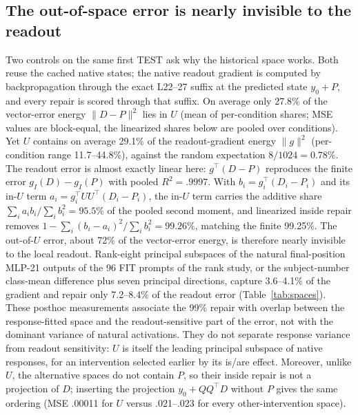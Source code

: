 \documentclass[11pt]{article}
\begin{document}
\subsection{The out-of-space error is nearly invisible to the readout}
Two controls on the same first TEST ask why the historical space works. Both reuse the cached native states; the native readout gradient is computed by backpropagation through the exact L22--27 suffix at the predicted state $y_0+P$, and every repair is scored through that suffix. On average only 27.8\% of the vector-error energy $\|D-P\|^2$ lies in $U$ (mean of per-condition shares; MSE values are block-equal, the linearized shares below are pooled over conditions). Yet $U$ contains on average 29.1\% of the readout-gradient energy $\|g\|^2$ (per-condition range 11.7--44.8\%), against the random expectation $8/1024=0.78\%$. The readout error is almost exactly linear here: $g^\top(D-P)$ reproduces the finite error $g_I(D)-g_I(P)$ with pooled $R^2=.9997$. With $b_i=g_i^\top(D_i-P_i)$ and its in-$U$ term $a_i=g_i^\top UU^\top(D_i-P_i)$, the in-$U$ term carries the additive share $\sum_i a_ib_i/\sum_i b_i^2=95.5\%$ of the pooled second moment, and linearized inside repair removes $1-\sum_i(b_i-a_i)^2/\sum_i b_i^2=99.26\%$, matching the finite 99.25\%. The out-of-$U$ error, about 72\% of the vector-error energy, is therefore nearly invisible to the local readout. Rank-eight principal subspaces of the natural final-position MLP-21 outputs of the 96 FIT prompts of the rank study, or the subject-number class-mean difference plus seven principal directions, capture 3.6--4.1\% of the gradient and repair only 7.2--8.4\% of the readout error (Table~\ref{tab:spaces}). These posthoc measurements associate the 99\% repair with overlap between the response-fitted space and the readout-sensitive part of the error, not with the dominant variance of natural activations. They do not separate response variance from readout sensitivity: $U$ is itself the leading principal subspace of native responses, for an intervention selected earlier by its is/are effect. Moreover, unlike $U$, the alternative spaces do not contain $P$, so their inside repair is not a projection of $D$; inserting the projection $y_0+QQ^\top D$ without $P$ gives the same ordering (MSE .00011 for $U$ versus .021--.023 for every other-intervention space).
\end{document}
